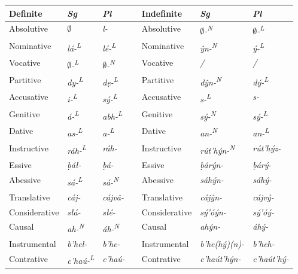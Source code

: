 \documentclass[a4paper, 12pt, twoside, openright, final]{book}
\let \nf \normalfont
\def \L {\textsuperscript{L}}
\def \N {\textsuperscript{N}}
\begin{document}
\noindent\begin{longtable}{l|>{\it}l|>{\it}lll|>{\it}l|>{\it}l}
Definite    &\nf Sg&\nf Pl && Indefinite       &\nf Sg&\nf Pl\\\cline{1-3}\cline{5-7}
\endhead
Absolutive      & $\emptyset$            & l-       && Absolutive    & $\emptyset$-\N       & $\emptyset$-\L  \\
Nominative      & lá-\L          & lé-\L    && Nominative    & ŷn-\N        & ý-\L    \\
Vocative        & $\emptyset$-\L         & $\emptyset$-\N   && Vocative      & /            & /       \\
Partitive       & dy-\L          & dẹ-\L    && Partitive     & dŷn-\N       & dý-\L   \\
Accusative      & i-\L           & sý-\L    && Accusative    & s-\L         & s-      \\
Genitive        & á-\L           & abh-\L   && Genitive      & sý-\N        & sý-\L   \\
Dative          & as-\L          & a-\L     && Dative        & an-\N        & an-\L   \\
Instructive     & ráh-\L         & ráh-     && Instructive   & rút’hýn-\N   & rút’hýz- \\\cline{1-3}\cline{5-7}

Essive          & ḅáł-           & ḅá-      && Essive        & ḅárýn-       & ḅárý-    \\
Abessive        & sá-\L          & sá-\N    && Abessive      & sáhýn-       & sáhý-    \\
Translative     & cáj-           & cájvâ-   && Translative   & cájŷn-       & cájvý-   \\ %
Considerative   & słá-           & słé-     && Considerative & sý’óýn-      & sý’óý-   \\
Causal          & ah-\N          & áh-\N    && Causal        & ahýn-        & áhý-     \\ %
Instrumental    & b’hel-         & b’he-    && Instrumental  & b’he(hý)(n)- & b’heh-   \\
Contrative      & c’haú-\L       & c’haú-   && Contrative    & c’haút’hýn-  & c’haút’hý- \\\cline{1-3}\cline{5-7} %


\end{longtable}
\end{document}
